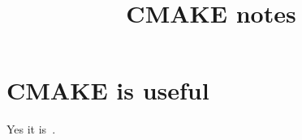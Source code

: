 \documentclass[12pt,a4paper]{article}
\title{CMAKE notes}
\begin{document}
\maketitle

\section{CMAKE is useful}

Yes it is~\cite{wiki-cmake}.



\end{document}
